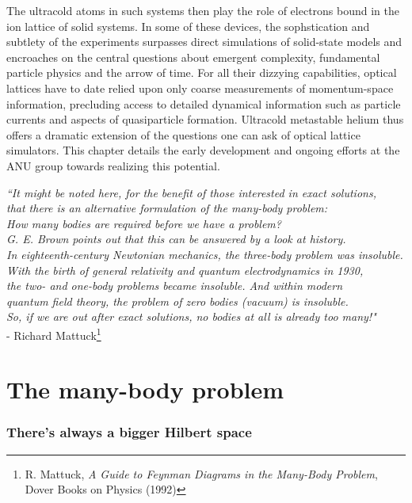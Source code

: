 	The ultracold atoms in such systems then play the role of electrons bound in the ion lattice of solid systems.
	In some of these devices, the sophstication and subtlety of the experiments surpasses direct simulations of solid-state models and encroaches on the central questions about emergent complexity, fundamental particle physics and the arrow of time.
	For all their dizzying capabilities, optical lattices have to date relied upon only coarse measurements of momentum-space information, precluding access to detailed dynamical information such as particle currents and aspects of quasiparticle formation.
	Ultracold metastable helium thus offers a dramatic extension of the questions one can ask of optical lattice simulators.
	This chapter details the early development and ongoing efforts at the ANU \mhe group towards realizing this potential.


\begin{adjustwidth}{1.5cm}{0cm}
\begin{flushright}
\emph{``It might be noted here, for the benefit of those interested in exact solutions, \\
that there is an alternative formulation of the many-body problem:\\
How many bodies are required before we have a problem? \\
G.	E.	Brown points out that this can be answered by a look at history.	\\
In eighteenth-century Newtonian mechanics, the three-body problem was insoluble.	\\
With the birth of general relativity and quantum electrodynamics in 1930,\\ the two- and one-body problems became insoluble. And within modern\\
 quantum field theory, the problem of zero bodies (vacuum) is insoluble.\\
So, if we are out after exact solutions, no bodies at all is already too many!"}\\
 - Richard Mattuck\footnote{R. Mattuck, \emph{A Guide to Feynman Diagrams in the Many-Body Problem}, Dover Books on Physics (1992)}
\end{flushright}
\end{adjustwidth}

\section{The many-body problem}
\subsubsection*{There's always a bigger Hilbert space}

